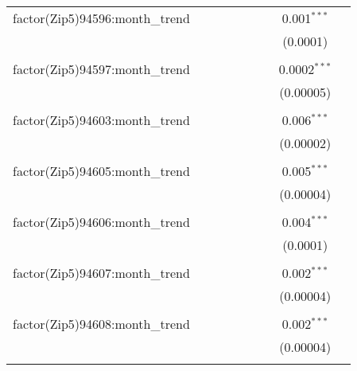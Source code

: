\begin{table}[H]
{\begin{tabular}{@{\extracolsep{5pt}}lcccccccc}
  factor(Zip5)94596:month\_trend &  &  &  &  &  &  & 0.001$^{***}$ &  \\  

   &  &  &  &  &  &  & (0.0001) &  \\  

   & & & & & & & & \\  

  factor(Zip5)94597:month\_trend &  &  &  &  &  &  & 0.0002$^{***}$ &  \\  

   &  &  &  &  &  &  & (0.00005) &  \\  

   & & & & & & & & \\  

  factor(Zip5)94603:month\_trend &  &  &  &  &  &  & 0.006$^{***}$ &  \\  

   &  &  &  &  &  &  & (0.00002) &  \\  

   & & & & & & & & \\  

  factor(Zip5)94605:month\_trend &  &  &  &  &  &  & 0.005$^{***}$ &  \\  

   &  &  &  &  &  &  & (0.00004) &  \\  

   & & & & & & & & \\  

  factor(Zip5)94606:month\_trend &  &  &  &  &  &  & 0.004$^{***}$ &  \\  

   &  &  &  &  &  &  & (0.0001) &  \\  

   & & & & & & & & \\  

  factor(Zip5)94607:month\_trend &  &  &  &  &  &  & 0.002$^{***}$ &  \\  

   &  &  &  &  &  &  & (0.00004) &  \\  

   & & & & & & & & \\  

  factor(Zip5)94608:month\_trend &  &  &  &  &  &  & 0.002$^{***}$ &  \\  

   &  &  &  &  &  &  & (0.00004) &  \\  

   & & & & & & & & \\  


\end{tabular}}
\end{table}

